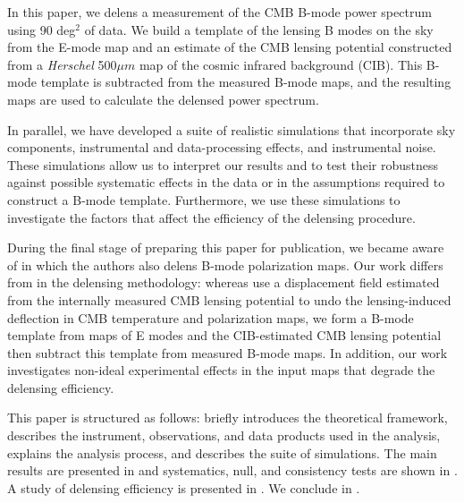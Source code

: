 In this paper, we delens a measurement of the CMB B-mode power spectrum using 90 deg$^2$ of \sptpol data.
We build a template of the lensing B modes on the sky from the \sptpol E-mode map and an estimate of the CMB lensing potential constructed from a \textit{Herschel} 500$\mu m$ map of the cosmic infrared background (CIB).
This B-mode template is subtracted from the measured \sptpol B-mode maps, and the resulting maps are used to calculate the delensed power spectrum.

In parallel, we have developed a suite of realistic simulations that incorporate sky components, instrumental and data-processing effects, and instrumental noise.
These simulations allow us to interpret our results and to test their robustness against possible systematic effects in the data or in the assumptions required to construct a B-mode template.
Furthermore, we use these simulations to investigate the factors that affect the efficiency of the delensing procedure.

During the final stage of preparing this paper for publication, we became aware of \cite{carron17} in which the authors also delens B-mode polarization maps.
Our work differs from \cite{carron17} in the delensing methodology:
whereas \cite{carron17} use a displacement field estimated from the internally measured CMB lensing potential to undo the lensing-induced deflection in CMB temperature and polarization maps,
we form a B-mode template from maps of E modes and the CIB-estimated CMB lensing potential then subtract this template from measured B-mode maps.
In addition, our work investigates non-ideal experimental effects in the input maps that degrade the delensing efficiency.

This paper is structured as follows:
 briefly introduces the theoretical framework,  describes the instrument, observations, and data products used in the analysis,  explains the analysis process, and  describes the suite of simulations. The main results are presented in  and systematics, null, and consistency tests are shown in .
A study of delensing efficiency is presented in .
We conclude in .

\setcounter{footnote}{0}
